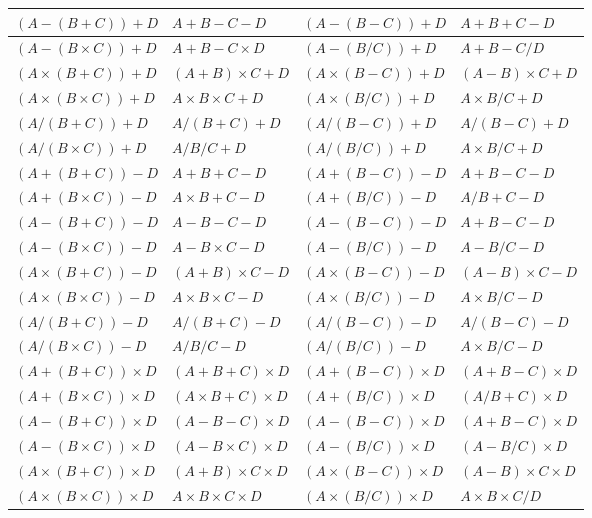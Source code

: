 \documentclass[11pt]{article}
\begin{document}
\begin{table}[htbp]
{\begin{tabular}{|l|l|l|l|}
$(A-(B+C))+D$ & $A+B-C-D$ & $(A-(B-C))+D$ & $A+B+C-D$  \\ \hline
$(A-(B \times C))+D$ & $A+B-C \times D$ & $(A-(B/C))+D$ & $A+B-C/D$  \\ \hline
$(A \times (B+C))+D$ & $(A+B) \times C+D$ & $(A \times (B-C))+D$ & $(A-B) \times C+D$  \\ \hline
$(A \times (B \times C))+D$ & $A \times B \times C+D$ & $(A \times (B/C))+D$ & $A \times B/C+D$  \\ \hline
$(A/(B+C))+D$ & $A/(B+C)+D$ & $(A/(B-C))+D$ & $A/(B-C)+D$  \\ \hline
$(A/(B \times C))+D$ & $A/B/C+D$ & $(A/(B/C))+D$ & $A \times B/C+D$  \\ \hline
$(A+(B+C))-D$ & $A+B+C-D$ & $(A+(B-C))-D$ & $A+B-C-D$  \\ \hline
$(A+(B \times C))-D$ & $A \times B+C-D$ & $(A+(B/C))-D$ & $A/B+C-D$  \\ \hline
$(A-(B+C))-D$ & $A-B-C-D$ & $(A-(B-C))-D$ & $A+B-C-D$  \\ \hline
$(A-(B \times C))-D$ & $A-B \times C-D$ & $(A-(B/C))-D$ & $A-B/C-D$  \\ \hline
$(A \times (B+C))-D$ & $(A+B) \times C-D$ & $(A \times (B-C))-D$ & $(A-B) \times C-D$  \\ \hline
$(A \times (B \times C))-D$ & $A \times B \times C-D$ & $(A \times (B/C))-D$ & $A \times B/C-D$  \\ \hline
$(A/(B+C))-D$ & $A/(B+C)-D$ & $(A/(B-C))-D$ & $A/(B-C)-D$  \\ \hline
$(A/(B \times C))-D$ & $A/B/C-D$ & $(A/(B/C))-D$ & $A \times B/C-D$  \\ \hline
$(A+(B+C)) \times D$ & $(A+B+C) \times D$ & $(A+(B-C)) \times D$ & $(A+B-C) \times D$  \\ \hline
$(A+(B \times C)) \times D$ & $(A \times B+C) \times D$ & $(A+(B/C)) \times D$ & $(A/B+C) \times D$  \\ \hline
$(A-(B+C)) \times D$ & $(A-B-C) \times D$ & $(A-(B-C)) \times D$ & $(A+B-C) \times D$  \\ \hline
$(A-(B \times C)) \times D$ & $(A-B \times C) \times D$ & $(A-(B/C)) \times D$ & $(A-B/C) \times D$  \\ \hline
$(A \times (B+C)) \times D$ & $(A+B) \times C \times D$ & $(A \times (B-C)) \times D$ & $(A-B) \times C \times D$  \\ \hline
$(A \times (B \times C)) \times D$ & $A \times B \times C \times D$ & $(A \times (B/C)) \times D$ & $A \times B \times C/D$  \\ \hline

\end{tabular}}
\end{table}
\end{document}
